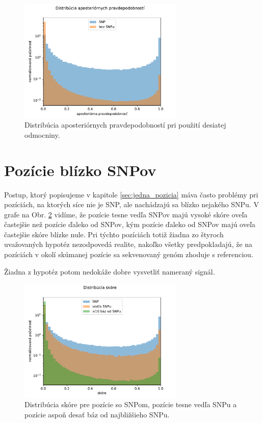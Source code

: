 \begin{figure}[t]
\centerline{\includegraphics[width=0.7\textwidth]{plots/0_root_eqbins}}
\caption[Aposteriórne pravdepodobnosti pri použití desiatej odmocniny]{Distribúcia aposteriórnych pravdepodobností pri použití desiatej odmocniny.}
\label{fig:aposteriori_root}
\end{figure}

\section{Pozície blízko SNPov}
\label{sec:blizke_pozicie}

Postup, ktorý popisujeme v kapitole \ref{sec:jedna_pozicia} máva často problémy pri pozíciách, na ktorých síce nie je SNP, ale nachádzajú
sa blízko nejakého SNPu. V grafe na Obr. \ref{fig:score_by_SNP_proximity} vidíme, že pozície tesne vedľa SNPov majú vysoké skóre
oveľa častejšie než pozície ďaleko od SNPov, kým pozície ďaleko od SNPov majú oveľa častejšie skóre blízke nule.
Pri týchto pozíciách totiž žiadna zo štyroch uvažovaných hypotéz nezodpovedá realite, nakoľko všetky predpokladajú,
že na pozíciách v okolí skúmanej pozície sa sekvenovaný genóm zhoduje s referenciou.


Žiadna z hypotéz potom nedokáže dobre vysvetliť nameraný signál.

\begin{figure}
\centerline{\includegraphics[width=0.7\textwidth]{plots/1_windowed_eqbins}}
\caption[Skóre pozícií so SNPom, vedľa SNPu a ďaleko od SNPu]{Distribúcia skóre pre pozície so SNPom, pozície tesne vedľa SNPu a pozície aspoň desať báz od najbližšieho SNPu.}
\label{fig:score_by_SNP_proximity}
\end{figure}

